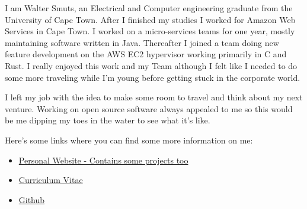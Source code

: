 I am Walter Smuts, an Electrical and Computer engineering graduate from the
University of Cape Town. After I finished my studies I worked for Amazon Web
Services in Cape Town. I worked on a micro-services teams for one year, mostly
maintaining software written in Java. Thereafter I joined a team doing new feature
development on the AWS EC2 hypervisor working primarily in C and Rust. I really
enjoyed this work and my Team although I felt like I needed to do some more
traveling while I'm young before getting stuck in the corporate world.

I left my job with the idea to make some room to travel and think about my next
venture. Working on open source software always appealed to me so this would be me
dipping my toes in the water to see what it's like.

Here's some links where you can find some more information on me:
\begin{itemize}
\item \href{https://www.waltersmuts.com}{Personal Website - Contains some projects too}
\item \href{https://www.waltersmuts.com/Walter\%20Smuts\%20-\%20Curriculum\%20Vitae.pdf}{Curriculum Vitae}
\item \href{https://github.com/WalterSmuts}{Github}
\end{itemize}
